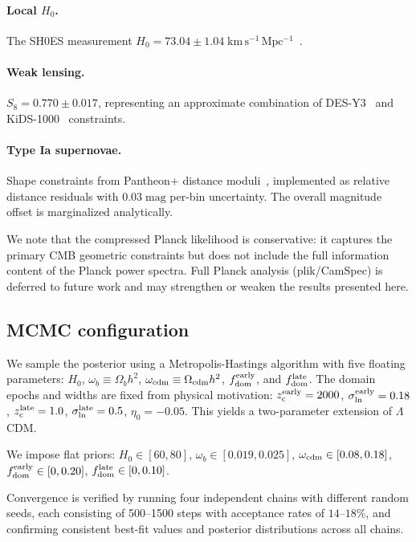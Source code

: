 \documentclass[aps,prd,twocolumn,superscriptaddress,nofootinbib]{revtex4-2}
\newcommand{\fdom}{f_{\rm dom}}
\newcommand{\zc}{z_{\rm c}}
\newcommand{\sln}{\sigma_{\ln}}
\begin{document}
\paragraph{Local $H_0$.}
The SH0ES measurement $H_0 = 73.04 \pm 1.04\;\mathrm{km\,s^{-1}\,
Mpc^{-1}}$~\cite{Riess2022}.

\paragraph{Weak lensing.}
$S_8 = 0.770 \pm 0.017$, representing an approximate combination
of DES-Y3~\cite{DES2022} and KiDS-1000~\cite{KiDS2021} constraints.

\paragraph{Type Ia supernovae.}
Shape constraints from Pantheon+ distance moduli~\cite{Pantheon2022},
implemented as relative distance residuals with $0.03\;\mathrm{mag}$
per-bin uncertainty. The overall magnitude offset is marginalized
analytically.

We note that the compressed Planck likelihood is conservative: it
captures the primary CMB geometric constraints but does not include
the full information content of the Planck power spectra. Full Planck
analysis (plik/CamSpec) is deferred to future work and may
strengthen or weaken the results presented here.

\subsection{MCMC configuration}

We sample the posterior using a Metropolis-Hastings algorithm with
five floating parameters: $H_0$, $\omega_b \equiv \Omega_b h^2$,
$\omega_{\rm cdm} \equiv \Omega_{\rm cdm} h^2$, $\fdom^{\rm early}$,
and $\fdom^{\rm late}$. The domain epochs and widths are fixed from
physical motivation: $\zc^{\rm early} = 2000$, $\sln^{\rm early} =
0.18$, $\zc^{\rm late} = 1.0$, $\sln^{\rm late} = 0.5$, $\eta_0 =
-0.05$. This yields a two-parameter extension of $\Lambda$CDM.

We impose flat priors: $H_0 \in [60, 80]$, $\omega_b \in [0.019,
0.025]$, $\omega_{\rm cdm} \in [0.08, 0.18]$, $\fdom^{\rm early} \in
[0, 0.20]$, $\fdom^{\rm late} \in [0, 0.10]$.

Convergence is verified by running four independent chains with
different random seeds, each consisting of 500--1500 steps with
acceptance rates of $14$--$18\%$, and confirming consistent
best-fit values and posterior distributions across all chains.
\end{document}
